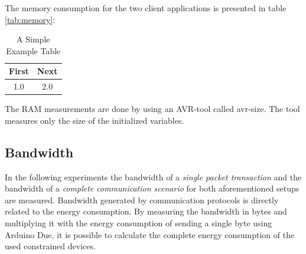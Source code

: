 The memory consumption for the two client applications is presented in table \ref{tab:memory}:
\begin{table}[!t]
\renewcommand{\arraystretch}{1.3}
\caption{A Simple Example Table}
\label{table_example}
\centering
\begin{tabular}{c|c}
\hline
\bfseries First & \bfseries Next\\
\hline
1.0 & 2.0\\
\hline
\end{tabular}
\end{table}

The RAM measurements are done by using an AVR-tool called avr-size. The tool measures only the size of the initialized variables.

\subsection{Bandwidth}
In the following experiments the bandwidth of a \emph{single packet transaction} and the bandwidth of a \emph{complete communication scenario} for both aforementioned setups are measured. 
Bandwidth generated by communication protocols is directly related to the energy consumption. By measuring the bandwidth in bytes and multiplying it with the energy consumption of sending a single byte using Arduino Due, it is possible to calculate the complete energy consumption of the used constrained devices. 

